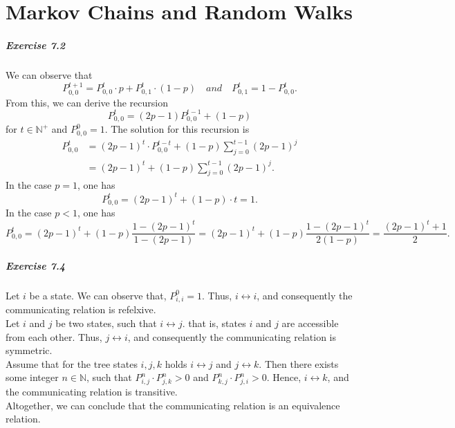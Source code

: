 \chapter{Markov Chains and Random Walks}

\paragraph{Exercise 7.2} We can observe that
\[
  P_{0,0}^{t+1} = P_{0,0}^t \cdot p + P_{0,1}^t \cdot (1 - p)
  \quad and \quad
  P_{0,1}^t = 1 - P_{0,0}^t.
\]
From this, we can derive the recursion
\[
  P_{0,0}^{t} = (2p-1)P_{0,0}^{t-1} + (1-p)
\]
for $t \in \mathbb{N}^+$ and $P_{0,0}^0 = 1$. The solution for this recursion is
\begin{align*}
  P_{0,0}^t
  &= (2p-1)^{t} \cdot P_{0,0}^{t-t} + (1-p) \sum_{j=0}^{t-1}(2p-1)^j \\
  &= (2p-1)^{t} + (1-p) \sum_{j=0}^{t-1}(2p-1)^j.
\end{align*}
In the case $p = 1$, one has
\[
  P_{0,0}^t
    = (2p-1)^{t} + (1-p) \cdot t
    = 1.
\]
In the case $p < 1$, one has
\[
  P_{0,0}^t
    = (2p-1)^{t} + (1-p) \frac{1-(2p-1)^{t}}{1-(2p-1)}
    = (2p-1)^{t} + (1-p) \frac{1-(2p-1)^{t}}{2(1-p)}
    = \frac{(2p-1)^{t} + 1}{2}.
\]

\paragraph{Exercise 7.4} Let $i$ be a state. We can observe that, $P_{i,i}^0 = 1$.
Thus, $i \leftrightarrow i$, and consequently the communicating relation is
refelxive. \\
Let $i$ and $j$ be two states, such that $i \leftrightarrow j$. that is, states
$i$ and $j$ are accessible from each other. Thus, $j \leftrightarrow i$, and
consequently the communicating relation is symmetric. \\
Assume that for the tree states $i,j,k$ holds $i \leftrightarrow j$ and
$j \leftrightarrow k$. Then there exists some integer $n \in \mathbb{N}$, such
that $P_{i,j}^n\cdot P_{j,k}^n > 0$ and $P_{k,j}^n \cdot P_{j,i}^n > 0$. Hence,
$i \leftrightarrow k$, and the communicating relation is transitive. \\
Altogether, we can conclude that the communicating relation is an equivalence
relation.

